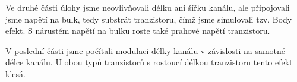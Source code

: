 \documentclass{protokol}
\begin{document}
  Ve druhé části úlohy jsme neovlivňovali délku ani šířku kanálu, ale připojovali jsme napětí na bulk, tedy substrát tranzistoru, čímž jsme simulovali tzv. Body efekt. S nárustém napětí na bulku roste také prahové napětí tranzistoru. 

  V poslední části jsme počítali modulaci délky kanálu v závislosti na samotné délce kanálu. U obou typů tranzistorů s rostoucí délkou tranzistoru tento efekt klesá.

\end{document}
